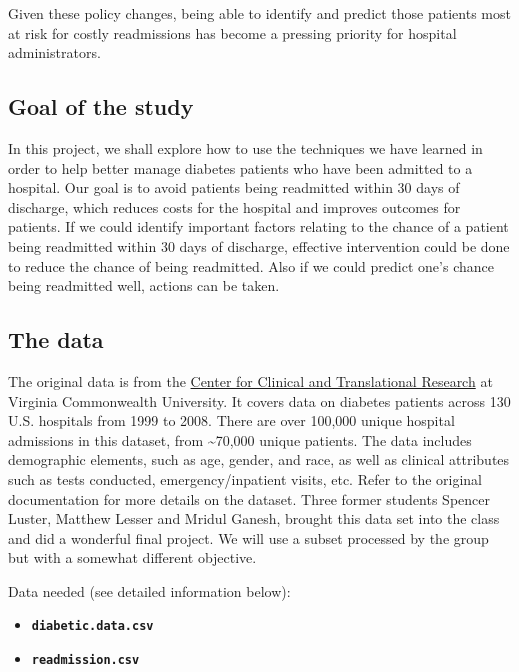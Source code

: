 \documentclass[
]{article}
\providecommand{\tightlist}{%
  \setlength{\itemsep}{0pt}\setlength{\parskip}{0pt}}
\begin{document}
Given these policy changes, being able to identify and predict those
patients most at risk for costly readmissions has become a pressing
priority for hospital administrators.

\hypertarget{goal-of-the-study}{%
\subsection{Goal of the study}\label{goal-of-the-study}}

In this project, we shall explore how to use the techniques we have
learned in order to help better manage diabetes patients who have been
admitted to a hospital. Our goal is to avoid patients being readmitted
within 30 days of discharge, which reduces costs for the hospital and
improves outcomes for patients. If we could identify important factors
relating to the chance of a patient being readmitted within 30 days of
discharge, effective intervention could be done to reduce the chance of
being readmitted. Also if we could predict one's chance being readmitted
well, actions can be taken.

\hypertarget{the-data}{%
\subsection{The data}\label{the-data}}

The original data is from the
\href{https://archive.ics.uci.edu/ml/datasets/Diabetes+130-US+hospitals+for+years+1999-2008}{Center
for Clinical and Translational Research} at Virginia Commonwealth
University. It covers data on diabetes patients across 130 U.S.
hospitals from 1999 to 2008. There are over 100,000 unique hospital
admissions in this dataset, from \textasciitilde70,000 unique patients.
The data includes demographic elements, such as age, gender, and race,
as well as clinical attributes such as tests conducted,
emergency/inpatient visits, etc. Refer to the original documentation for
more details on the dataset. Three former students Spencer Luster,
Matthew Lesser and Mridul Ganesh, brought this data set into the class
and did a wonderful final project. We will use a subset processed by the
group but with a somewhat different objective.

Data needed (see detailed information below):

\begin{itemize}
\tightlist
\item
  \textbf{\texttt{diabetic.data.csv}}
\item
  \textbf{\texttt{readmission.csv}}
\end{itemize}
\end{document}
